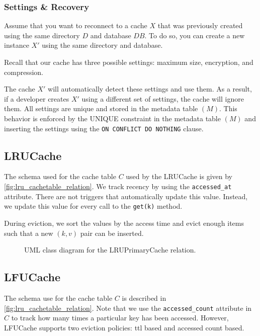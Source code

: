 \subsubsection{Settings \& Recovery}
Assume that you want to reconnect to a cache $X$ that was previously
created using the same directory $D$ and database $DB$. To do so, you can
create a new instance $X'$ using the same directory and database.

Recall that our cache has three possible settings: maximum size, encryption, and compression.

The cache $X'$ will automatically detect these settings and use them. As a result,
if a developer creates $X'$ using a different set of settings, the cache will
ignore them. All settings are unique and stored
in the metadata table $(M)$. This behavior is enforced by the UNIQUE
constraint in the metadata table $(M)$ and inserting
the settings using the \texttt{ON CONFLICT DO NOTHING} clause.

\subsection{LRUCache\label{sec:lru}}
The schema used for the cache table $C$ used by the LRUCache
is given by \autoref{fig:lru_cachetable_relation}. We track
recency by using the \texttt{accessed\_at} attribute. There
are not triggers that automatically update this value. Instead,
we update this value for every call to the \texttt{get(k)}
method.

During eviction, we sort the values
by the access time and evict enough items
such that a new $(k, v)$ pair can be inserted.

\begin{figure}[!htp]
    \centering
    \caption{UML class diagram for the LRUPrimaryCache relation.}
    \label{fig:lru_cachetable_relation}
\end{figure}

\subsection{LFUCache\label{sec:lfu}}
The schema use for the cache table $C$ is
described in \autoref{fig:lru_cachetable_relation}.
Note that we use the \texttt{accessed\_count} attribute
in $C$ to track how many times a particular key
has been accessed. However, LFUCache supports two eviction
policies: ttl based and accessed count based.


